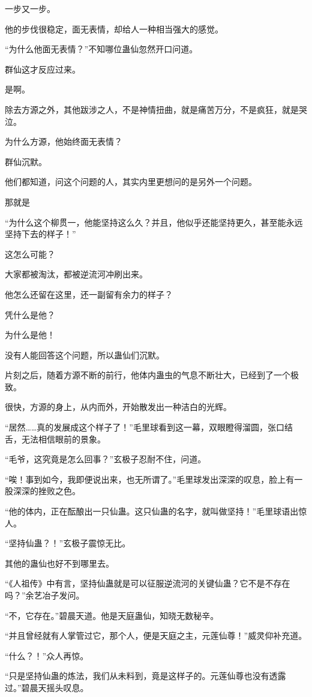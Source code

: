 \begin{this_body}
一步又一步。

他的步伐很稳定，面无表情，却给人一种相当强大的感觉。

“为什么他面无表情？”不知哪位蛊仙忽然开口问道。

群仙这才反应过来。

是啊。

除去方源之外，其他跋涉之人，不是神情扭曲，就是痛苦万分，不是疯狂，就是哭泣。

为什么方源，他始终面无表情？

群仙沉默。

他们都知道，问这个问题的人，其实内里更想问的是另外一个问题。

那就是

“为什么这个柳贯一，他能坚持这么久？并且，他似乎还能坚持更久，甚至能永远坚持下去的样子！”

这怎么可能？

大家都被淘汰，都被逆流河冲刷出来。

他怎么还留在这里，还一副留有余力的样子？

凭什么是他？

为什么是他！

没有人能回答这个问题，所以蛊仙们沉默。

片刻之后，随着方源不断的前行，他体内蛊虫的气息不断壮大，已经到了一个极致。

很快，方源的身上，从内而外，开始散发出一种洁白的光辉。

“居然……真的发展成这个样子了！”毛里球看到这一幕，双眼瞪得溜圆，张口结舌，无法相信眼前的景象。

“毛爷，这究竟是怎么回事？”玄极子忍耐不住，问道。

“唉！事到如今，我即便说出来，也无所谓了。”毛里球发出深深的叹息，脸上有一股深深的挫败之色。

“他的体内，正在酝酿出一只仙蛊。这只仙蛊的名字，就叫做坚持！”毛里球语出惊人。

“坚持仙蛊？！”玄极子震惊无比。

其他的蛊仙也好不到哪里去。

“《人祖传》中有言，坚持仙蛊就是可以征服逆流河的关键仙蛊？它不是不存在吗？”余艺冶子发问。

“不，它存在。”碧晨天道。他是天庭蛊仙，知晓无数秘辛。

“并且曾经就有人掌管过它，那个人，便是天庭之主，元莲仙尊！”威灵仰补充道。

“什么？！”众人再惊。

“只是坚持仙蛊的炼法，我们从未料到，竟是这样子的。元莲仙尊也没有透露过。”碧晨天摇头叹息。


\end{this_body}

